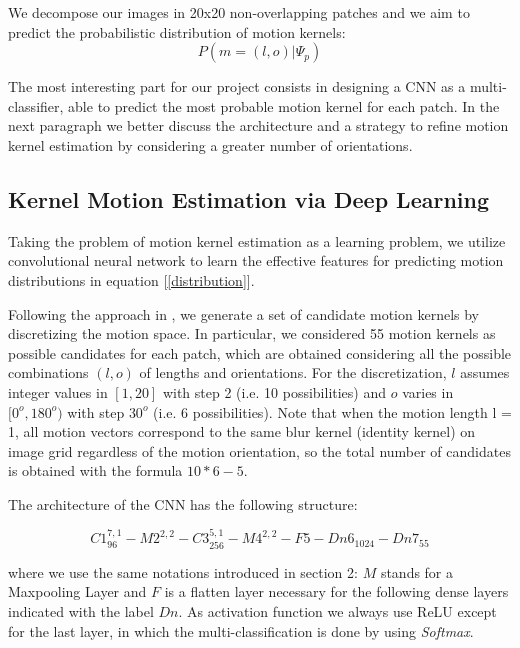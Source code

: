 \documentclass[12pt,a4paper]{report}
\begin{document}
We decompose our images in 20x20 non-overlapping patches and we aim to predict the probabilistic distribution of motion kernels: 
\begin{equation}
P(m = (l, o)|\Psi_p)
\label{distribution}
\end{equation}

The most interesting part for our project consists in designing a CNN as a multi-classifier, able to predict the most probable motion kernel for each patch. In the next paragraph we better discuss the architecture and a strategy to refine motion kernel estimation by considering a greater number of orientations. 

\subsection{Kernel Motion Estimation via Deep Learning}

Taking the problem of motion kernel estimation as a learning problem, we utilize convolutional neural network to learn the effective features for predicting motion distributions in equation [\ref{distribution}].

Following the approach in \cite{S&Al}, we generate a set of candidate motion kernels by discretizing the motion space. In particular, we considered 55 motion kernels as possible candidates for each patch, which are obtained considering all the possible combinations $(l,o)$ of lengths and orientations. For the discretization, $l$ assumes integer values in $[1,20]$ with step 2 (i.e. 10 possibilities) and $o$ varies in $[0^o, 180^o)$ with step $30^o$ (i.e. 6 possibilities). Note that when
the motion length l = 1, all motion vectors correspond to
the same blur kernel (identity kernel) on image grid regardless of the motion orientation, so the total number of candidates is obtained with the formula $10*6-5$. 

The architecture of the CNN has the following structure:

\begin{equation}
C1_{96}^{7,1} - M2^{2,2} - C3_{256}^{5,1} - M4^{2,2} - F5 - Dn6_{1024} - Dn7_{55}
\end{equation}

where we use the same notations introduced in section 2: $M$ stands for a Maxpooling Layer and $F$ is a flatten layer necessary for the following dense layers indicated with the label $Dn$. As activation function we always use ReLU except for the last layer, in which the multi-classification is done by using \textit{Softmax}.
\end{document}
